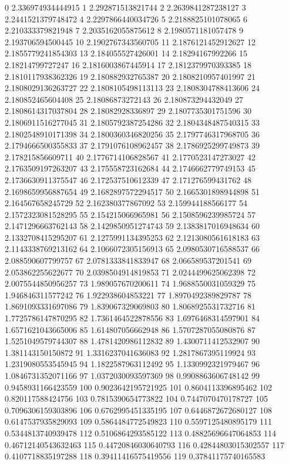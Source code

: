 0 2.336974934444915
1 2.292871513821744
2 2.2639841287238127
3 2.2441521379748472
4 2.2297866440034726
5 2.2188825101078065
6 2.210333379821948
7 2.2035162055875612
8 2.1980571181057478
9 2.193706594500445
10 2.1902767343560705
11 2.1876121452912627
12 2.1855779241854303
13 2.184055527426001
14 2.18294167992266
15 2.18214799727247
16 2.1816003867445914
17 2.1812379970393385
18 2.1810117938362326
19 2.180882932765387
20 2.1808210957401997
21 2.1808029136263727
22 2.1808105498113113
23 2.1808304788413606
24 2.180852465604408
25 2.18086873272143
26 2.180873294432049
27 2.1808614317037804
28 2.18082928336897
29 2.1807735301751596
30 2.1806911516277045
31 2.1805792387254286
32 2.1804348487540315
33 2.1802548910171398
34 2.1800360346820256
35 2.1797746317968705
36 2.1794666500355833
37 2.1791076108962457
38 2.1786925299749873
39 2.178215856609711
40 2.1776714106828567
41 2.1770523147273027
42 2.1763509197263207
43 2.175558723162684
44 2.1746662779749153
45 2.1736630911375547
46 2.172537510612339
47 2.171276599431762
48 2.1698659956887654
49 2.1682897572294517
50 2.1665301898944898
51 2.164567658245729
52 2.162380377867092
53 2.159944188566177
54 2.1572323081528295
55 2.154215066965981
56 2.1508596239985724
57 2.1471296663762143
58 2.1429850951274743
59 2.1383817016948634
60 2.1332708415295207
61 2.1275991134395253
62 2.1213080561618183
63 2.1143338769213162
64 2.1066072305156913
65 2.0980530716588537
66 2.088590607799757
67 2.0781333841833947
68 2.066589537201541
69 2.053862255622677
70 2.0398504914819853
71 2.0244499625062398
72 2.0075544850956257
73 1.989057670200611
74 1.9688550031059329
75 1.946846311577242
76 1.922938604853221
77 1.8970492389829787
78 1.8691093331697086
79 1.839067329069803
80 1.8068925531732716
81 1.7725786147870295
82 1.7361464522878556
83 1.6976468314597901
84 1.6571621043665006
85 1.614807056662948
86 1.5707287055080876
87 1.5251049579744307
88 1.4781420986112832
89 1.4300711412532907
90 1.381143150150872
91 1.3316237041636083
92 1.2817867395119924
93 1.2319080553545945
94 1.1822587963112492
95 1.1330992321979467
96 1.0846731352071166
97 1.0372030093597369
98 0.9908863606748142
99 0.9458931166423559
100 0.9023642195721925
101 0.8604113396895462
102 0.820117588424756
103 0.7815390654773822
104 0.7447070470178727
105 0.7096306159303896
106 0.6762995451335195
107 0.6446872672680127
108 0.6147537935829093
109 0.5864484772549823
110 0.5597125480895179
111 0.5344813740939478
112 0.5106864293585122
113 0.48825696647064853
114 0.46712140543632463
115 0.44720846030640793
116 0.42844803015302557
117 0.4107718835197288
118 0.39411416575419556
119 0.37841175740165583
